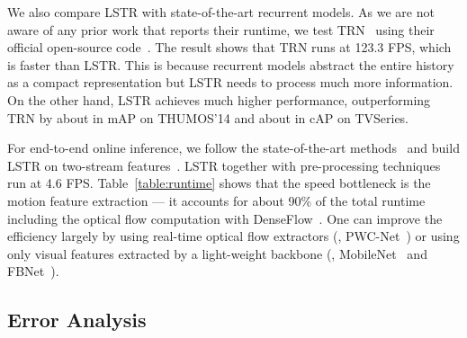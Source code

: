 We also compare LSTR with state-of-the-art recurrent models.
As we are not aware of any prior work that reports their runtime, we test TRN~\cite{xu2019temporal} using their official open-source code~\cite{trn}.
The result shows that TRN runs at 123.3 FPS, which is faster than LSTR.
This is because recurrent models abstract the entire history as a compact representation but LSTR needs to process much more information.
On the other hand, LSTR achieves much higher performance, outperforming TRN by about  in mAP on THUMOS'14 and about  in cAP on TVSeries.

For end-to-end online inference, we follow the state-of-the-art methods~\cite{xu2019temporal,eun2020learning,gao2020woad}
and build LSTR on two-stream features~\cite{wang2016temporal}.
LSTR together with pre-processing techniques run at 4.6 FPS.
Table~\ref{table:runtime} shows that the speed bottleneck is the motion feature extraction --- it accounts for about 90\% of the total runtime including the optical flow computation with DenseFlow~\cite{denseflow}.
One can improve the efficiency largely by using real-time optical flow extractors (\eg, PWC-Net~\cite{sun2018pwc}) or using only visual features extracted by a light-weight backbone (\eg, MobileNet~\cite{howard2017mobilenets} and FBNet~\cite{wu2019fbnet}).

\vspace{-2mm}
\subsection{Error Analysis}
\label{exp:error}
\vspace{-2mm}

\begin{table}[!htp]
    \vspace{-3.5mm}
    \caption{
        \textbf{Action classes with highest and lowest performance} on THUMOS'14.
    }
    \vspace{1mm}
    \begin{minipage}{1.0\linewidth}
        \centering
        \setlength\tabcolsep{3.5pt}
    \end{minipage}
    \label{table:action_classes}
    \vspace{-1mm}
\end{table}

